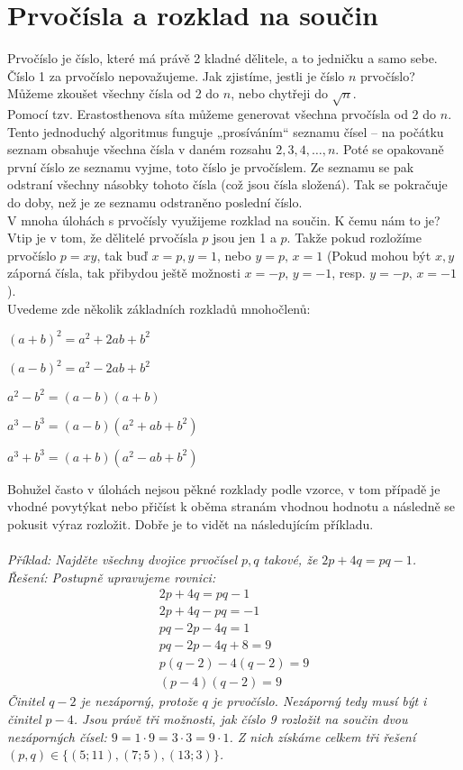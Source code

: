 \documentclass[12pt,a4paper]{report}
\begin{document}
\section{Prvočísla a rozklad na součin}
Prvočíslo je číslo, které má právě 2 kladné dělitele, a to jedničku a samo sebe. Číslo 1 za prvočíslo nepovažujeme. Jak zjistíme, jestli je číslo $n$ prvočíslo? Můžeme zkoušet všechny čísla od 2 do $n$, nebo chytřeji do $\sqrt{n}$. 
\\Pomocí tzv. Erastosthenova síta můžeme generovat všechna prvočísla od 2 do $n$. Tento jednoduchý algoritmus funguje „prosíváním“ seznamu čísel – na počátku seznam obsahuje všechna čísla v daném rozsahu $2, 3, 4, \ldots, n$. Poté se opakovaně první číslo ze seznamu vyjme, toto číslo je prvočíslem. Ze seznamu se pak odstraní všechny násobky tohoto čísla (což jsou čísla složená). Tak se pokračuje do doby, než je ze seznamu odstraněno poslední číslo. 
\\ V mnoha úlohách s prvočísly využijeme rozklad na součin. K čemu nám to je? Vtip je v tom, že dělitelé prvočísla $p$ jsou jen 1 a $p$. Takže pokud rozložíme prvočíslo $p=xy$, tak buď $x=p,y=1$, nebo $y=p,\,x=1$ (Pokud mohou být $x,y$ záporná čísla, tak přibydou ještě možnosti $x=-p,\,y=-1$, resp. $y=-p,\,x=-1$).
\\Uvedeme zde několik základních rozkladů mnohočlenů: 
\begin{description}
	\item $(a+b)^2=a^2+2ab+b^2$
	\item $(a-b)^2=a^2-2ab+b^2$
	\item $a^2-b^2=(a-b)(a+b)$
	\item $a^3-b^3=(a-b)(a^2+ab+b^2)$
	\item $a^3+b^3=(a+b)(a^2-ab+b^2)$
\end{description}
Bohužel často v úlohách nejsou pěkné rozklady podle vzorce, v tom případě je vhodné povytýkat nebo přičíst k oběma stranám vhodnou hodnotu a následně se pokusit výraz rozložit. Dobře je to vidět na následujícím příkladu.
\\\\ \textit{Příklad: Najděte všechny dvojice prvočísel $p, q$ takové, že $2p + 4q = pq - 1$.
	\\Řešení: Postupně upravujeme rovnici:
	\begin{align*}
	2p + 4q = pq - 1\\
	2p+4q-pq=-1\\
	pq-2p-4q=1\\
	pq-2p-4q+8=9\\
	p(q-2)-4(q-2)=9\\
	(p-4)(q-2)=9
	\end{align*} 
	Činitel $q - 2$ je nezáporný, protože $q$ je prvočíslo. Nezáporný tedy musí být i činitel $p - 4$. Jsou právě tři možnosti, jak číslo 9 rozložit na součin dvou nezáporných čísel: $9=1\cdot9=3\cdot3=9\cdot 1$. Z nich získáme celkem tři řešení $(p, q) \in \{(5; 11),(7; 5),(13; 3)\}$.}
\end{document}
